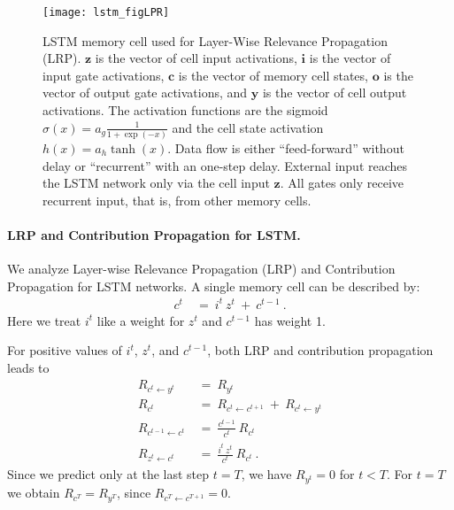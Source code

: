 \documentclass{article}
\newcommand\Bc{\bm{c}}
\newcommand\Bi{\bm{i}}
\newcommand\Bo{\bm{o}}
\newcommand\By{\bm{y}}
\newcommand\Bz{\bm{z}}
\begin{document}
\begin{appendices}
\begin{figure}[htb]
\centering
\texttt{[image: lstm\_figLPR]}
\caption{LSTM memory cell used for Layer-Wise Relevance Propagation (LRP). 
$\Bz$ is the vector of cell input
activations, $\Bi$ is the vector of input gate
activations,  $\Bc$ is the vector of memory cell states,
$\Bo$ is the vector of output gate
activations, and $\By$ is the vector of cell output 
activations. The activation functions are
the sigmoid $\sigma(x)=a_g \frac{1}{1+\exp(-x)}$
and the cell state activation $h(x)=a_h \tanh(x)$. 
Data flow is either ``feed-forward''
without delay or ``recurrent'' with an one-step delay.
External input reaches the LSTM network 
only via the cell input $\Bz$. All gates only receive
recurrent input, that is, from other memory cells.
\label{fig:cellLRP}}
\end{figure}



\paragraph{LRP and Contribution Propagation for LSTM.}

We analyze Layer-wise Relevance Propagation (LRP) and Contribution Propagation
for LSTM networks.
A single memory cell can be described by:
\begin{align}
c^t \ &= \  i^t \ z^t \ + \ c^{t-1} \ .
\end{align}
Here we treat $i^t$ like a weight for $z^t$ and $c^{t-1}$ has weight 1.


For positive values of $i^t$,  $z^t$, and $c^{t-1}$,
both LRP and contribution propagation leads to
\begin{align}
    R_{c^t \leftarrow y^t}\ &= \  R_{y^t} \\
    R_{c^t}\ &= \   R_{c^t \leftarrow c^{t+1}} \ + \ R_{c^t \leftarrow y^t} \\
    R_{c^{t-1} \leftarrow c^t}\ &= \  \frac{c^{t-1}}{c^t} \ R_{c^t} \\
    R_{z^t \leftarrow c^t}\ &= \  \frac{ i^t \ z^t }{c^t} \ R_{c^t} \ .
\end{align}
Since we predict only at the last step $t=T$, we have
$R_{y^t}=0$ for $t<T$. For $t=T$ we obtain $R_{c^T}=R_{y^T}$, since
$R_{c^T \leftarrow c^{T+1}} =0$.


\end{appendices}
\end{document}

